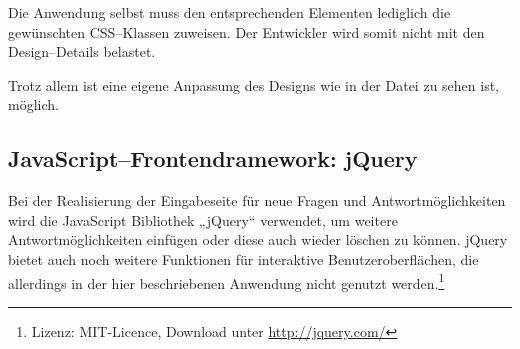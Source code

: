 Die Anwendung selbst muss den entsprechenden Elementen lediglich die gewünschten CSS--Klassen zuweisen. Der Entwickler wird somit nicht mit den Design--Details belastet.

Trotz allem ist eine eigene Anpassung des Designs wie in der Datei  zu sehen ist, möglich. 

\subsection{JavaScript--Frontendramework: jQuery}

Bei der Realisierung der Eingabeseite für neue Fragen und Antwortmöglichkeiten wird die JavaScript Bibliothek „jQuery“ verwendet, um weitere Antwortmöglichkeiten einfügen oder diese auch wieder löschen zu können. jQuery bietet auch noch weitere Funktionen für interaktive Benutzeroberflächen, die allerdings in der hier beschriebenen Anwendung nicht genutzt werden.\footnote{Lizenz: MIT-Licence, Download unter \url{http://jquery.com/}}

